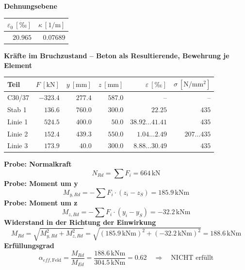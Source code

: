 \documentclass[11pt,a4paper]{article}
\begin{document}
\noindent\textbf{Dehnungsebene}
\begin{longtable}{rr}
\hline
$\varepsilon_0\ [\text{‰}]$ & $\kappa\ [\mathrm{1/m}]$ \\
\hline
\endhead
$20.965$ & $0.07689$ \\
\hline
\end{longtable}
\noindent\textbf{Kräfte im Bruchzustand -- Beton als Resultierende, Bewehrung je Element}
\begin{longtable}{lrrrrr}
\hline
Teil & $F\ [\mathrm{kN}]$ & $y\ [\mathrm{mm}]$ & $z\ [\mathrm{mm}]$ & $\varepsilon\ [\text{‰}]$ & $\sigma\ [\mathrm{N/mm^2}]$ \\
\hline
\endhead
C30/37 & $-323.4$ & $277.4$ & $587.0$ & – & – \\
Stab 1 & $136.6$ & $760.0$ & $300.0$ & $22.25$ & $435$ \\
Linie 1 & $524.5$ & $400.0$ & $50.0$ & $38.92 \ldots 41.41$ & $435$ \\
Linie 2 & $152.4$ & $439.3$ & $550.0$ & $1.04 \ldots 2.49$ & $207 \ldots 435$ \\
Linie 3 & $173.9$ & $40.0$ & $300.0$ & $8.88 \ldots 30.49$ & $435$ \\
\hline
\end{longtable}
\noindent\textbf{Probe: Normalkraft}
\begin{equation*}
N_{Rd} = \sum F_i = 664\,\mathrm{kN}
\end{equation*}
\noindent\textbf{Probe: Moment um y}
\begin{equation*}
M_{y,Rd} = -\sum F_i \cdot (z_i - z_S) = 185.9\,\mathrm{kNm}
\end{equation*}
\noindent\textbf{Probe: Moment um z}
\begin{equation*}
M_{z,Rd} = -\sum F_i \cdot (y_i - y_S) = -32.2\,\mathrm{kNm}
\end{equation*}
\noindent\textbf{Widerstand in der Richtung der Einwirkung}
\begin{equation*}
M_{Rd} = \sqrt{M_{y,Rd}^{2} + M_{z,Rd}^{2}} = \sqrt{\left(185.9\,\mathrm{kNm}\right)^{2} + \left(-32.2\,\mathrm{kNm}\right)^{2}} = 188.6\,\mathrm{kNm}
\end{equation*}
\noindent\textbf{Erfüllungsgrad}
\begin{equation*}
\alpha_{eff,\text{Feld}} = \frac{M_{Rd}}{M_{Ed}} = \frac{188.6\,\mathrm{kNm}}{304.5\,\mathrm{kNm}} = 0.62 \quad \Rightarrow \quad \text{NICHT erfüllt}
\end{equation*}
\end{document}
